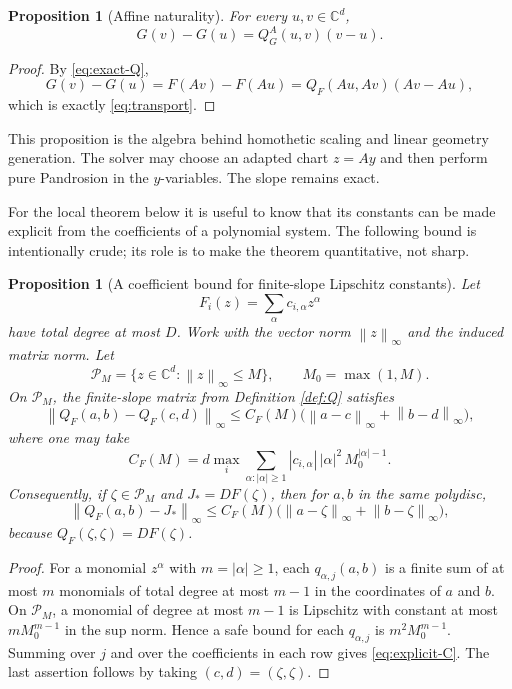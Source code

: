 \documentclass[11pt]{article}
\newtheorem{proposition}[theorem]{Proposition}
\theoremstyle{definition}
\theoremstyle{remark}
\newcommand{\C}{\mathbb{C}}
\newcommand{\norm}[1]{\left\lVert #1\right\rVert}
\newcommand{\zetaRoot}{\zeta}
\newcommand{\polydisc}{\mathcal{P}}
\begin{document}
\begin{proposition}[Affine naturality]\label{prop:affine}
For every $u,v\in\C^d$,
\[
        G(v)-G(u)=Q_G^A(u,v)(v-u).
\]
\end{proposition}

\begin{proof}
By \eqref{eq:exact-Q},
\[
        G(v)-G(u)=F(Av)-F(Au)=Q_F(Au,Av)(Av-Au),
\]
which is exactly \eqref{eq:transport}.
\end{proof}

This proposition is the algebra behind homothetic scaling and linear geometry generation.  The solver may choose an adapted chart $z=Ay$ and then perform pure Pandrosion in the $y$-variables.  The slope remains exact.

For the local theorem below it is useful to know that its constants can be made explicit from the coefficients of a polynomial system.  The following bound is intentionally crude; its role is to make the theorem quantitative, not sharp.

\begin{proposition}[A coefficient bound for finite-slope Lipschitz constants]\label{prop:L-bound}
Let
\[
        F_i(z)=\sum_\alpha c_{i,\alpha}z^\alpha
\]
have total degree at most $D$.  Work with the vector norm $\norm{z}_\infty$ and the induced matrix norm.  Let
\[
        \polydisc_M=\{z\in\C^d:\norm{z}_\infty\leq M\},
        \qquad M_0=\max(1,M).
\]
On $\polydisc_M$, the finite-slope matrix from Definition \ref{def:Q} satisfies
\begin{equation}\label{eq:explicit-C}
        \norm{Q_F(a,b)-Q_F(c,d)}_\infty
        \leq C_F(M)\bigl(\norm{a-c}_\infty+\norm{b-d}_\infty\bigr),
\end{equation}
where one may take
\begin{equation}\label{eq:CFM}
        C_F(M)
        =d\max_i\sum_{\alpha:|\alpha|\geq 1}
        |c_{i,\alpha}|\,|\alpha|^2\,M_0^{|\alpha|-1}.
\end{equation}
Consequently, if $\zetaRoot\in\polydisc_M$ and $J_*=DF(\zetaRoot)$, then for $a,b$ in the same polydisc,
\begin{equation}\label{eq:eta-explicit}
        \norm{Q_F(a,b)-J_*}_\infty
        \leq C_F(M)\bigl(\norm{a-\zetaRoot}_\infty+\norm{b-\zetaRoot}_\infty\bigr),
\end{equation}
because $Q_F(\zetaRoot,\zetaRoot)=DF(\zetaRoot)$.
\end{proposition}

\begin{proof}
For a monomial $z^\alpha$ with $m=|\alpha|\geq 1$, each $q_{\alpha,j}(a,b)$ is a finite sum of at most $m$ monomials of total degree at most $m-1$ in the coordinates of $a$ and $b$.  On $\polydisc_M$, a monomial of degree at most $m-1$ is Lipschitz with constant at most $mM_0^{m-1}$ in the sup norm.  Hence a safe bound for each $q_{\alpha,j}$ is $m^2M_0^{m-1}$.  Summing over $j$ and over the coefficients in each row gives \eqref{eq:explicit-C}.  The last assertion follows by taking $(c,d)=(\zetaRoot,\zetaRoot)$.
\end{proof}
\end{document}
